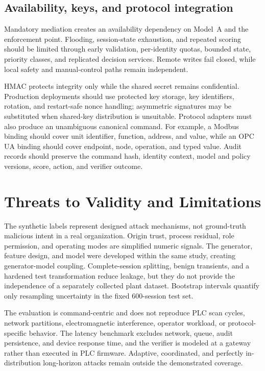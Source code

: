 \documentclass[journal]{IEEEtran}
\begin{document}
\subsection{Availability, keys, and protocol integration}
Mandatory mediation creates an availability dependency on Model~A and the enforcement point. Flooding, session-state exhaustion, and repeated scoring should be limited through early validation, per-identity quotas, bounded state, priority classes, and replicated decision services. Remote writes fail closed, while local safety and manual-control paths remain independent.

HMAC protects integrity only while the shared secret remains confidential. Production deployments should use protected key storage, key identifiers, rotation, and restart-safe nonce handling; asymmetric signatures may be substituted when shared-key distribution is unsuitable. Protocol adapters must also produce an unambiguous canonical command. For example, a Modbus binding should cover unit identifier, function, address, and value, while an OPC UA binding should cover endpoint, node, operation, and typed value. Audit records should preserve the command hash, identity context, model and policy versions, score, action, and verifier outcome.

\section{Threats to Validity and Limitations}
The synthetic labels represent designed attack mechanisms, not ground-truth malicious intent in a real organization. Origin trust, process residual, role permission, and operating modes are simplified numeric signals. The generator, feature design, and model were developed within the same study, creating generator-model coupling. Complete-session splitting, benign transients, and a hardened test transformation reduce leakage, but they do not provide the independence of a separately collected plant dataset. Bootstrap intervals quantify only resampling uncertainty in the fixed 600-session test set.

The evaluation is command-centric and does not reproduce PLC scan cycles, network partitions, electromagnetic interference, operator workload, or protocol-specific behavior. The latency benchmark excludes network, queue, audit persistence, and device response time, and the verifier is modeled at a gateway rather than executed in PLC firmware. Adaptive, coordinated, and perfectly in-distribution long-horizon attacks remain outside the demonstrated coverage.
\end{document}
